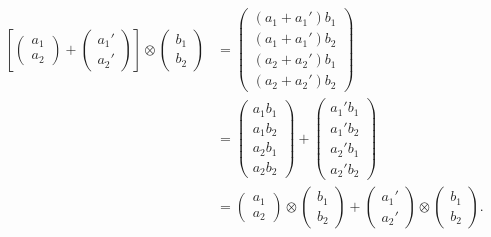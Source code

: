 \documentclass[pra,12pt]{revtex4-2}
\begin{document}
\begin{align}
  \left[\begin{pmatrix} a_1 \\ a_2 \end{pmatrix}
    + \begin{pmatrix} a_1' \\ a_2' \end{pmatrix} \right]
  \otimes \begin{pmatrix} b_1 \\ b_2 \end{pmatrix}
  &=
  \begin{pmatrix} (a_1+a_1') b_1 \\ (a_1+a_1') b_2 \\
    (a_2+a_2') b_1 \\ (a_2+a_2') b_2 \end{pmatrix} \\
  &=
  \begin{pmatrix} a_1 b_1 \\ a_1 b_2 \\ a_2 b_1 \\ a_2 b_2 \end{pmatrix}
  + \begin{pmatrix} a_1' b_1 \\ a_1' b_2 \\ a_2' b_1 \\ a_2' b_2 \end{pmatrix}\\
  &= \begin{pmatrix} a_1 \\ a_2 \end{pmatrix} \otimes
  \begin{pmatrix} b_1 \\ b_2 \end{pmatrix}
  + \begin{pmatrix} a_1' \\ a_2' \end{pmatrix} \otimes
  \begin{pmatrix} b_1 \\ b_2 \end{pmatrix}.
\end{align}
\end{document}
